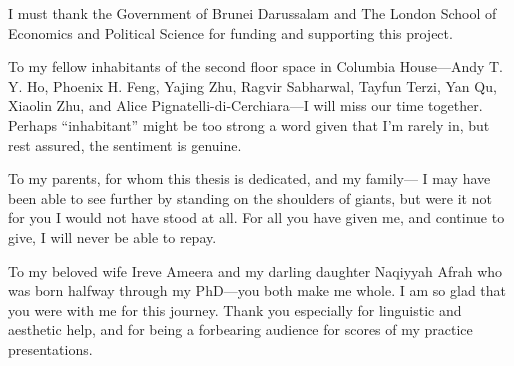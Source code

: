 \documentclass[11pt,twoside,openright]{report}
\begin{document}
I must thank the Government of Brunei Darussalam and The London School of Economics and Political Science for funding and supporting this project.

To my fellow inhabitants of the second floor space in Columbia House---Andy T. Y. Ho, Phoenix H. Feng, Yajing Zhu, Ragvir Sabharwal, Tayfun Terzi, Yan Qu, Xiaolin Zhu, and Alice Pignatelli-di-Cerchiara---I will miss our time together.
Perhaps ``inhabitant'' might be too strong a word given that I'm rarely in, but rest assured, the sentiment is genuine.

To my parents, for whom this thesis is dedicated, and my family---
I may have been able to see further by standing on the shoulders of giants, but were it not for you I would not have stood at all.
For all you have given me, and continue to give, I will never be able to repay.

To my beloved wife Ireve Ameera and my darling daughter Naqiyyah Afrah who was born halfway through my PhD---you both make me whole. 
I am so glad that you were with me for this journey.
Thank you especially for linguistic and aesthetic help, and for being a forbearing audience for scores of my practice presentations.
\end{document}
